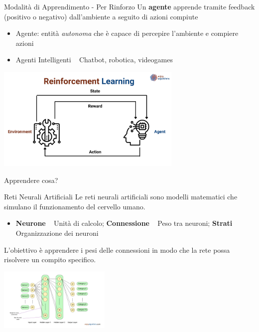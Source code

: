 \documentclass[presentation, 10pt,aspectratio=169]{beamer}\mode<presentation>{\usetheme{AMSBolognaFC}}
\begin{document}
\begin{frame}{Modalità di Apprendimento - Per Rinforzo}
	Un \textbf{agente} apprende tramite \alert{feedback} (positivo o negativo) dall'ambiente a seguito di azioni compiute
	\begin{itemize}
		\item Agente: entità \emph{autonoma} che è capace di percepire l'ambiente e compiere azioni 
		\item Agenti Intelligenti \faArrowRight ~ Chatbot, robotica, videogames
	\end{itemize}
	\begin{center}
	\includegraphics[height=5cm]{img/reinforcement-learning.png}
	\end{center}
\end{frame}
\begin{frame}{Apprendere cosa?}
	\begin{exampleblock}{Reti Neurali Artificiali}
		Le reti neurali artificiali sono modelli matematici 
		che simulano il funzionamento del cervello umano.
		\begin{itemize}
			\item \textbf{Neurone} \faArrowRight ~ Unità di calcolo; \textbf{Connessione} \faArrowRight ~ Peso tra neuroni; \textbf{Strati} \faArrowRight ~ Organizzazione dei neuroni
		\end{itemize}
		L'obiettivo è \alert{apprendere} i pesi delle connessioni in modo che la rete possa risolvere un compito specifico.
	\end{exampleblock}
	\begin{center}
	\includegraphics[width=0.4\textwidth]{img/ann.png}
	\end{center}
\end{frame}
\end{document}
